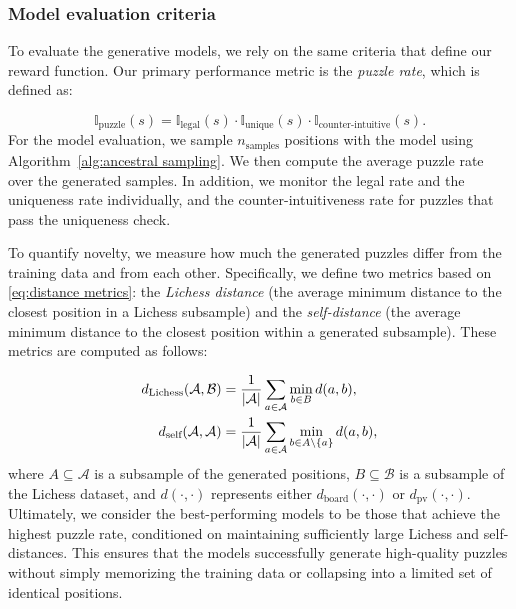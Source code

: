 \subsubsection{Model evaluation criteria}
\label{sec:evaluation criteria}

To evaluate the generative models, we rely on the same criteria that define our reward function. Our primary performance metric is the \textit{puzzle rate}, which is defined as:

\begin{equation*}
    \mathbb{I}_{\text{puzzle}}(s) = \mathbb{I}_{\text{legal}}(s) \cdot \mathbb{I}_{\text{unique}}(s) \cdot \mathbb{I}_{\text{counter-intuitive}}(s).
\end{equation*}
For the model evaluation, we sample $n_{\text{samples}}$ positions with the model using Algorithm~\ref{alg:ancestral sampling}. We then compute the average puzzle rate over the generated samples. In addition, we monitor the legal rate and the uniqueness rate individually, and the counter-intuitiveness rate for puzzles that pass the uniqueness check.

To quantify novelty, we measure how much the generated puzzles differ from the training data and from each other. Specifically, we define two metrics based on \eqref{eq:distance metrics}: the \textit{Lichess distance} (the average minimum distance to the closest position in a Lichess subsample) and the \textit{self-distance} (the average minimum distance to the closest position within a generated subsample). These metrics are computed as follows:

\begin{align*}
    d_{\text{Lichess}}(\mathcal{A}, \mathcal{B}) &= \frac{1}{\abs{\mathcal{A}}}\sum_{a\in \mathcal{A}}\min_{b\in B}d(a, b),\\
    d_{\text{self}}(\mathcal{A}, \mathcal{A}) &= \frac{1}{\abs{\mathcal{A}}}\sum_{a\in \mathcal{A}}\min_{b\in A\setminus \{a\}}d(a, b),
\end{align*}
where $A \subseteq \mathcal{A}$ is a subsample of the generated positions, $B \subseteq \mathcal{B}$ is a subsample of the Lichess dataset, and $d(\cdot, \cdot)$ represents either $d_{\mathrm{board}}(\cdot, \cdot)$ or $d_{\mathrm{pv}}(\cdot, \cdot)$. Ultimately, we consider the best-performing models to be those that achieve the highest puzzle rate, conditioned on maintaining sufficiently large Lichess and self-distances. This ensures that the models successfully generate high-quality puzzles without simply memorizing the training data or collapsing into a limited set of identical positions.

